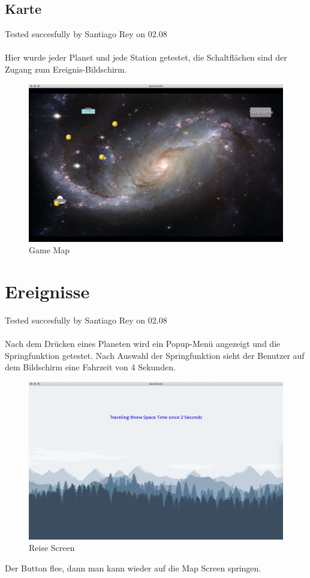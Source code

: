 \documentclass[12pt]{article}
\begin{document}
\subsection{Karte}
Tested succesfully by Santiago Rey on 02.08\\\\
Hier wurde jeder Planet und jede Station getestet, die Schaltflächen sind der Zugang zum Ereignis-Bildschirm.\\
\begin{figure}
\centering
\includegraphics[scale=0.4]{TestProtocolBilder/map.jpg}
\caption{Game Map}
\end{figure}
\newpage
\section{Ereignisse}
Tested succesfully by Santiago Rey on 02.08\\\\
Nach dem Drücken eines Planeten wird ein Popup-Menü angezeigt und die Springfunktion getestet. Nach Auswahl der Springfunktion sieht der Benutzer auf dem Bildschirm eine Fahrzeit von 4 Sekunden.
\begin{figure}[htp]
\centering
\includegraphics[scale=0.4]{TestProtocolBilder/traveling.jpg}
\caption{Reise Screen}
\end{figure}
Der Button flee, dann man kann wieder auf die Map Screen springen.
\newpage
\end{document}
